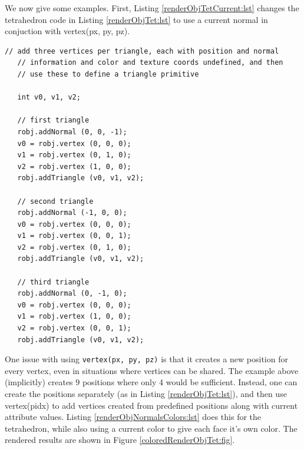 We now give some examples. First, Listing
\ref{renderObjTetCurrent:lst} changes the tetrahedron code in
Listing \ref{renderObjTet:lst} to use a current normal in
conjuction with
%
{vertex(px, py, pz)}.
%
\begin{lstlisting}[caption={Constructing a render object using current normals.},
label=renderObjTetCurrent:lst]
   // add three vertices per triangle, each with position and normal
   // information and color and texture coords undefined, and then
   // use these to define a triangle primitive

   int v0, v1, v2;

   // first triangle
   robj.addNormal (0, 0, -1);
   v0 = robj.vertex (0, 0, 0);
   v1 = robj.vertex (0, 1, 0);
   v2 = robj.vertex (1, 0, 0);
   robj.addTriangle (v0, v1, v2);

   // second triangle
   robj.addNormal (-1, 0, 0);
   v0 = robj.vertex (0, 0, 0);
   v1 = robj.vertex (0, 0, 1);
   v2 = robj.vertex (0, 1, 0);
   robj.addTriangle (v0, v1, v2);

   // third triangle
   robj.addNormal (0, -1, 0);
   v0 = robj.vertex (0, 0, 0);
   v1 = robj.vertex (1, 0, 0);
   v2 = robj.vertex (0, 0, 1);
   robj.addTriangle (v0, v1, v2);
\end{lstlisting}
%
One issue with using {\tt vertex(px, py, pz)} is that it creates a new
position for every vertex, even in situations where vertices can be
shared. The example above (implicitly) creates 9 positions where only
4 would be sufficient. Instead, one can create the positions
separately (as in Listing \ref{renderObjTet:lst}), and then use
%
{vertex(pidx)} to add vertices created from predefined positions along
with current attribute values. Listing \ref{renderObjNormalsColors:lst}
does this for the tetrahedron, while also using a current color
to give each face it's own color. The rendered results are
shown in Figure \ref{coloredRenderObjTet:fig}.
%
